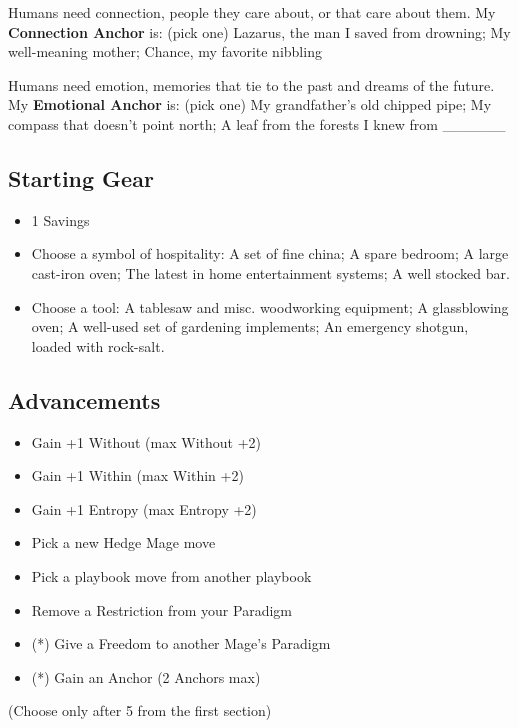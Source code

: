 \documentclass[
  oneside,
  statementpaper,
  9pt]{memoir}
\begin{document}
Humans need connection, people they care about, or that care about them.
My \textbf{Connection Anchor} is: (pick one) Lazarus, the man I saved
from drowning; My well-meaning mother; Chance, my favorite nibbling

Humans need emotion, memories that tie to the past and dreams of the
future. My \textbf{Emotional Anchor} is: (pick one) My grandfather's old
chipped pipe; My compass that doesn't point north; A leaf from the
forests I knew from \_\_\_\_\_\_

\hypertarget{starting-gear-1}{%
\subsection{Starting Gear}\label{starting-gear-1}}

\begin{itemize}
\tightlist
\item
  1 Savings
\item
  Choose a symbol of hospitality: A set of fine china; A spare bedroom;
  A large cast-iron oven; The latest in home entertainment systems; A
  well stocked bar.
\item
  Choose a tool: A tablesaw and misc. woodworking equipment; A
  glassblowing oven; A well-used set of gardening implements; An
  emergency shotgun, loaded with rock-salt.
\end{itemize}

\hypertarget{advancements-1}{%
\subsection{Advancements}\label{advancements-1}}

\begin{itemize}
\tightlist
\item
  Gain +1 Without (max Without +2)
\item
  Gain +1 Within (max Within +2)
\item
  Gain +1 Entropy (max Entropy +2)
\item
  Pick a new Hedge Mage move
\item
  Pick a playbook move from another playbook
\item
  Remove a Restriction from your Paradigm
\item
  (*) Give a Freedom to another Mage's Paradigm
\item
  (*) Gain an Anchor (2 Anchors max)
\end{itemize}

(Choose only after 5 from the first section)
\end{document}
